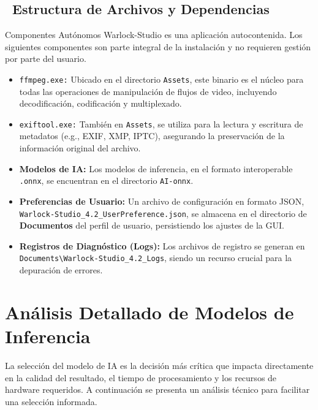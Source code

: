 \documentclass[11pt, a4paper]{article}
\newcommand{\SectionColor}{WarlockGray} %
\newcommand{\setsectioncolor}[1]{\renewcommand{\SectionColor}{#1}}
\newcommand{\inlinecode}[1]{\colorbox{WarlockLightGray}{\small\texttt{#1}}}
\begin{document}
\subsection{\faFolderOpen\ Estructura de Archivos y Dependencias}
\begin{infobox}{Componentes Autónomos}
Warlock-Studio es una aplicación autocontenida. Los siguientes componentes son parte integral de la instalación y no requieren gestión por parte del usuario.
\end{infobox}
\begin{itemize}[leftmargin=*]
    \item \inlinecode{ffmpeg.exe:} Ubicado en el directorio \texttt{Assets}, este binario es el núcleo para todas las operaciones de manipulación de flujos de video, incluyendo decodificación, codificación y multiplexado.
    \item \inlinecode{exiftool.exe:} También en \texttt{Assets}, se utiliza para la lectura y escritura de metadatos (e.g., EXIF, XMP, IPTC), asegurando la preservación de la información original del archivo.
    \item \textbf{Modelos de IA:} Los modelos de inferencia, en el formato interoperable \texttt{.onnx}, se encuentran en el directorio \texttt{AI-onnx}.
    \item \textbf{Preferencias de Usuario:} Un archivo de configuración en formato JSON, \texttt{Warlock-Studio\_4.2\_UserPreference.json}, se almacena en el directorio de \textbf{Documentos} del perfil de usuario, persistiendo los ajustes de la GUI.
    \item \textbf{Registros de Diagnóstico (Logs):} Los archivos de registro se generan en \texttt{Documents\textbackslash Warlock-Studio\_4.2\_Logs}, siendo un recurso crucial para la depuración de errores.
\end{itemize}

\setsectioncolor{ModelsColor}
\section{Análisis Detallado de Modelos de Inferencia}
La selección del modelo de IA es la decisión más crítica que impacta directamente en la calidad del resultado, el tiempo de procesamiento y los recursos de hardware requeridos. A continuación se presenta un análisis técnico para facilitar una selección informada.
\end{document}
